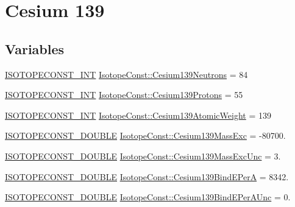 \hypertarget{group___isotope_const-_cesium-_cs139}{}\section{Cesium 139}
\label{group___isotope_const-_cesium-_cs139}
\subsection*{Variables}
\begin{DoxyCompactItemize}
\item 
\mbox{\hyperlink{group___isotope_const-_macros_ga5f18360b3e99483a35c32d789e62621c}{I\+S\+O\+T\+O\+P\+E\+C\+O\+N\+S\+T\+\_\+\+I\+NT}} \mbox{\hyperlink{group___isotope_const-_cesium-_cs139_ga3feb2b03785475992c86572558f0fe1b}{Isotope\+Const\+::\+Cesium139\+Neutrons}} = 84
\item 
\mbox{\hyperlink{group___isotope_const-_macros_ga5f18360b3e99483a35c32d789e62621c}{I\+S\+O\+T\+O\+P\+E\+C\+O\+N\+S\+T\+\_\+\+I\+NT}} \mbox{\hyperlink{group___isotope_const-_cesium-_cs139_ga9480cb46436ad0ba8a9dd16c8453daec}{Isotope\+Const\+::\+Cesium139\+Protons}} = 55
\item 
\mbox{\hyperlink{group___isotope_const-_macros_ga5f18360b3e99483a35c32d789e62621c}{I\+S\+O\+T\+O\+P\+E\+C\+O\+N\+S\+T\+\_\+\+I\+NT}} \mbox{\hyperlink{group___isotope_const-_cesium-_cs139_gac26c42dd408e8e4638634dff07ce9de1}{Isotope\+Const\+::\+Cesium139\+Atomic\+Weight}} = 139
\item 
\mbox{\hyperlink{group___isotope_const-_macros_ga8f45a7272ce02c0b4c65c44636ed719a}{I\+S\+O\+T\+O\+P\+E\+C\+O\+N\+S\+T\+\_\+\+D\+O\+U\+B\+LE}} \mbox{\hyperlink{group___isotope_const-_cesium-_cs139_ga4c064a590d03f131587cf2cbe44b0200}{Isotope\+Const\+::\+Cesium139\+Mass\+Exc}} = -\/80700.
\item 
\mbox{\hyperlink{group___isotope_const-_macros_ga8f45a7272ce02c0b4c65c44636ed719a}{I\+S\+O\+T\+O\+P\+E\+C\+O\+N\+S\+T\+\_\+\+D\+O\+U\+B\+LE}} \mbox{\hyperlink{group___isotope_const-_cesium-_cs139_ga7a3f7eb274db0e6a4e3049bac77ff7a8}{Isotope\+Const\+::\+Cesium139\+Mass\+Exc\+Unc}} = 3.
\item 
\mbox{\hyperlink{group___isotope_const-_macros_ga8f45a7272ce02c0b4c65c44636ed719a}{I\+S\+O\+T\+O\+P\+E\+C\+O\+N\+S\+T\+\_\+\+D\+O\+U\+B\+LE}} \mbox{\hyperlink{group___isotope_const-_cesium-_cs139_ga0105b536880c7a6d233d743862c5fe6d}{Isotope\+Const\+::\+Cesium139\+Bind\+E\+PerA}} = 8342.
\item 
\mbox{\hyperlink{group___isotope_const-_macros_ga8f45a7272ce02c0b4c65c44636ed719a}{I\+S\+O\+T\+O\+P\+E\+C\+O\+N\+S\+T\+\_\+\+D\+O\+U\+B\+LE}} \mbox{\hyperlink{group___isotope_const-_cesium-_cs139_gab502df682d1a8718ad5d4ef3dcb8846b}{Isotope\+Const\+::\+Cesium139\+Bind\+E\+Per\+A\+Unc}} = 0.

\end{DoxyCompactItemize}
